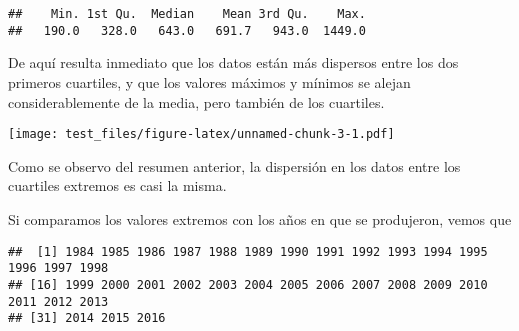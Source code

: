 \documentclass[
]{article}
\newenvironment{Shaded}{\begin{snugshade}}{\end{snugshade}}
\newcommand{\AttributeTok}[1]{\textcolor[rgb]{0.77,0.63,0.00}{#1}}
\newcommand{\DecValTok}[1]{\textcolor[rgb]{0.00,0.00,0.81}{#1}}
\newcommand{\FunctionTok}[1]{\textcolor[rgb]{0.00,0.00,0.00}{#1}}
\newcommand{\NormalTok}[1]{#1}
\newcommand{\OtherTok}[1]{\textcolor[rgb]{0.56,0.35,0.01}{#1}}
\newcommand{\SpecialCharTok}[1]{\textcolor[rgb]{0.00,0.00,0.00}{#1}}
\newcommand{\StringTok}[1]{\textcolor[rgb]{0.31,0.60,0.02}{#1}}
\begin{document}
\begin{verbatim}
##    Min. 1st Qu.  Median    Mean 3rd Qu.    Max. 
##   190.0   328.0   643.0   691.7   943.0  1449.0
\end{verbatim}

De aquí resulta inmediato que los datos están más dispersos entre los
dos primeros cuartiles, y que los valores máximos y mínimos se alejan
considerablemente de la media, pero también de los cuartiles.

\begin{Shaded}
\end{Shaded}

\texttt{[image: test\_files/figure-latex/unnamed-chunk-3-1.pdf]}

Como se observo del resumen anterior, la dispersión en los datos entre
los cuartiles extremos es casi la misma.

Si comparamos los valores extremos con los años en que se produjeron,
vemos que

\begin{Shaded}
\end{Shaded}

\begin{verbatim}
##  [1] 1984 1985 1986 1987 1988 1989 1990 1991 1992 1993 1994 1995 1996 1997 1998
## [16] 1999 2000 2001 2002 2003 2004 2005 2006 2007 2008 2009 2010 2011 2012 2013
## [31] 2014 2015 2016
\end{verbatim}

\begin{Shaded}
\end{Shaded}
\end{document}
